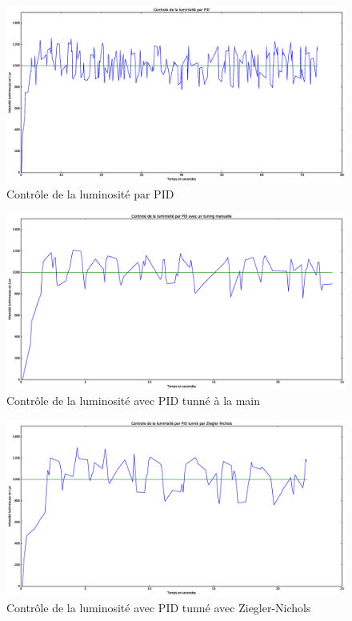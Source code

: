 \documentclass[a4paper,10pt]{report}
\begin{document}
\begin{figure}[htb!]
   \centering
   \includegraphics[scale=0.35]{PID.eps}
   \caption{\label{fig:pid} Contrôle de la luminosité par PID}
\end{figure}

\begin{figure}[htb!]
   \centering
   \includegraphics[scale=0.35]{Manuelle.eps}
   \caption{\label{fig:manuelle} Contrôle de la luminosité avec PID tunné à la main}
\end{figure}

\begin{figure}[htb!]
   \centering
   \includegraphics[scale=0.35]{Ziegler.eps}
   \caption{\label{fig:ziegler} Contrôle de la luminosité avec PID tunné avec Ziegler-Nichols}
\end{figure}
\end{document}
